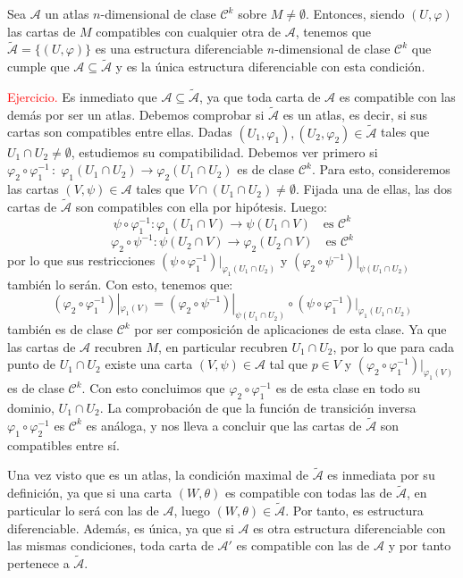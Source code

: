 \begin{prop}
Sea $\mathcal{A}$ un atlas $n$-dimensional de clase $\mathcal{C}^k$ sobre $M \neq \emptyset$. Entonces, siendo $(U,\varphi)$ las cartas de $M$ compatibles con cualquier otra de $\mathcal{A}$, tenemos que $\tilde{\mathcal{A}}=\{(U,\varphi)\}$ es una estructura diferenciable $n$-dimensional de clase $\mathcal{C}^k$ que cumple que $\mathcal{A} \subseteq \tilde{\mathcal{A}}$ y es la única estructura diferenciable con esta condici\'on.
\end{prop}
\begin{dem} \textcolor{red}{Ejercicio.}
Es inmediato que $\mathcal{A} \subseteq \tilde{\mathcal{A}}$, ya que toda carta de $\mathcal{A}$ es compatible con las demás por ser un atlas. Debemos comprobar si $\tilde{\mathcal{A}}$ es un atlas, es decir, si sus cartas son compatibles entre ellas. Dadas $(U_1,\varphi_1),(U_2,\varphi_2)\in \tilde{\mathcal{A}}$ tales que $U_1 \cap U_2 \neq \emptyset$, estudiemos su compatibilidad. Debemos ver primero si $\varphi_2 \circ \varphi_1^{-1}\,:\; \varphi_1(U_1 \cap U_2) \longrightarrow \varphi_2(U_1 \cap U_2)$ es de clase $\mathcal{C}^k$. Para esto, consideremos las cartas $(V,\psi) \in \mathcal{A}$ tales que $V \cap (U_1 \cap U_2) \neq \emptyset$. Fijada una de ellas, las dos cartas de $\tilde{\mathcal{A}}$ son compatibles con ella por hipótesis. Luego:
$$\psi \circ \varphi_1^{-1}: \varphi_1(U_1 \cap V) \to \psi(U_1 \cap V) \quad \text{es } \mathcal{C}^k$$
$$\varphi_2 \circ \psi^{-1}: \psi(U_2 \cap V) \to \varphi_2(U_2 \cap V) \quad \text{es } \mathcal{C}^k$$
por lo que sus restricciones $(\psi \circ \varphi_1^{-1})|_{\varphi_1(U_1 \cap U_2)}$ y $(\varphi_2 \circ \psi^{-1})|_{\psi(U_1\cap U_2)}$ también lo serán. Con esto, tenemos que: $$(\varphi_2 \circ \varphi_1^{-1})|_{\varphi_1(V)} = (\varphi_2 \circ \psi^{-1})|_{\psi(U_1\cap U_2)} \circ (\psi \circ \varphi_1^{-1})|_{\varphi_1(U_1 \cap U_2)}$$
también es de clase $\mathcal{C}^k$ por ser composición de aplicaciones de esta clase. Ya que las cartas de $\mathcal{A}$ recubren $M$, en particular recubren $U_1 \cap U_2$, por lo que para cada punto de $U_1 \cap U_2$ existe una carta $(V,\psi)\in\mathcal{A}$ tal que $p \in V$ y $(\varphi_2 \circ \varphi_1^{-1})|_{\varphi_1(V)}$ es de clase $\mathcal{C}^k$. Con esto concluimos que $\varphi_2 \circ \varphi_1^{-1}$ es de esta clase en todo su dominio, $U_1 \cap U_2$. La comprobación de que la función de transición inversa $\varphi_1 \circ \varphi_2^{-1}$ es $\mathcal{C}^k$ es análoga, y nos lleva a concluir que las cartas de $\tilde{\mathcal{A}}$ son compatibles entre sí.

Una vez visto que es un atlas, la condición maximal de $\tilde{\mathcal{A}}$ es inmediata por su definición, ya que si una carta $(W,\theta)$ es compatible con todas las de $\tilde{\mathcal{A}}$, en particular lo será con las de $\mathcal{A}$, luego $(W,\theta) \in \tilde{\mathcal{A}}$. Por tanto, es estructura diferenciable. Además, es única, ya que si $\mathcal{A}$ es otra estructura diferenciable con las mismas condiciones, toda carta de $\mathcal{A}'$ es compatible con las de $\mathcal{A}$ y por tanto pertenece a $\tilde{\mathcal{A}}$. 
\end{dem}

